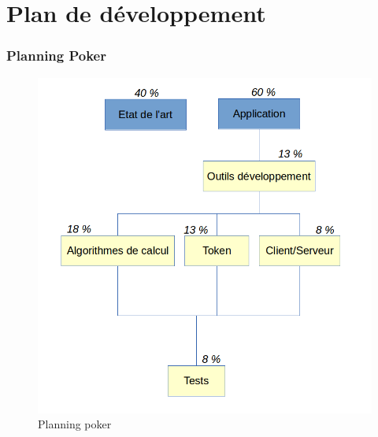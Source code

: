 \documentclass[xcolor=table]{beamer}
\begin{document}
\section{Plan de développement}
\begin{frame}
\frametitle{Planning Poker}
  \begin{figure}
    \includegraphics[scale=0.3]{img/planningpoker.png}
    \caption{Planning poker}
  \end{figure}
\end{frame}
\end{document}
